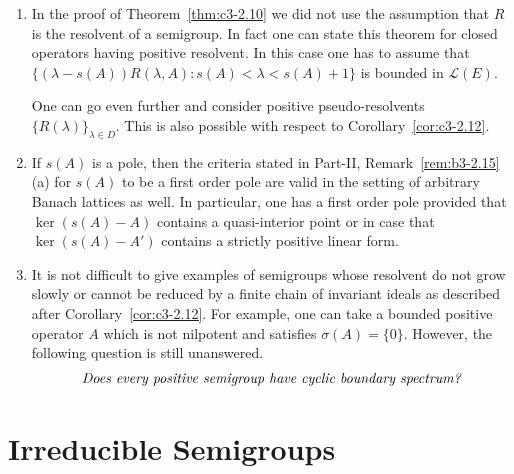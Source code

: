 \begin{remarks}\label{rem:c3-2.15}
\begin{enumerate}[\upshape (i), wide, labelindent=.25em]	
	\item 
	In the proof of Theorem~\ref{thm:c3-2.10} we did not use the assumption that $R$ is the resolvent of a semigroup.
	In fact one can state this theorem for closed operators having positive resolvent.
	In this case one has to assume that  
    $\{(\lambda-s(A))R(\lambda,A) : s(A) < \lambda < s(A)+1\}$
    is bounded in $\mathcal{L}(E)$.
	
	One can go even further and consider positive pseudo-resolvents 
    $\{R(\lambda)\}_{\lambda\in D}$.
	This is also possible with respect to Corollary~\ref{cor:c3-2.12}.
	
	\item 
	If\/ $s(A)$ is a pole, then the criteria stated in Part-II, Remark~\ref{rem:b3-2.15}\,(a) for $s(A)$ to be a first order pole are valid in the setting of arbitrary Banach lattices as well.
	In particular, one has a first order pole provided that $\ker(s(A) - A)$ contains a quasi-interior point or in case that $\ker(s(A) - A')$ contains a strictly positive linear form.
	
	\item 
	It is not difficult to give examples of semigroups whose resolvent do not grow slowly or cannot be reduced by a finite chain of invariant ideals as described after Corollary~\ref{cor:c3-2.12}.
	For example, one can take a bounded positive operator $A$ which is not nilpotent and satisfies $\sigma(A) = \{0\}$.
	However, the following question is still unanswered.
	\begin{equation*}
		\textit{Does every positive semigroup have cyclic boundary spectrum?}\index{boundary spectrum!cyclic}
	\end{equation*}
\end{enumerate}
\end{remarks}

\section{Irreducible Semigroups}\label{sec:c3-3}

